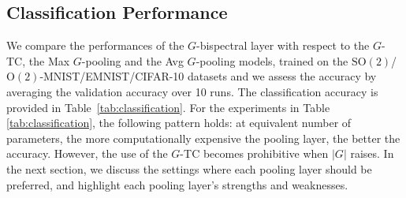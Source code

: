 \documentclass{article}
\theoremstyle{plain}
\theoremstyle{definition}
\theoremstyle{remark}
\begin{document}
\subsection{Classification Performance}
We compare the performances of the $G$-bispectral layer with respect to the $G$-TC, the Max $G$-pooling and the Avg $G$-pooling models, trained on the $\mathrm{SO}(2)$/$\mathrm{O}(2)$-MNIST/EMNIST/CIFAR-10 datasets and we assess the accuracy by averaging the validation accuracy over 10 runs. The classification accuracy is provided in Table~\ref{tab:classification}. For the experiments in Table \ref{tab:classification}, the following pattern holds: at equivalent number of parameters, the more computationally expensive the pooling layer, the better the accuracy. However, the use of the $G$-TC becomes prohibitive when $|G|$ raises. In the next section, we discuss the settings where each pooling layer should be preferred, and highlight each pooling layer's strengths and weaknesses.
\end{document}
